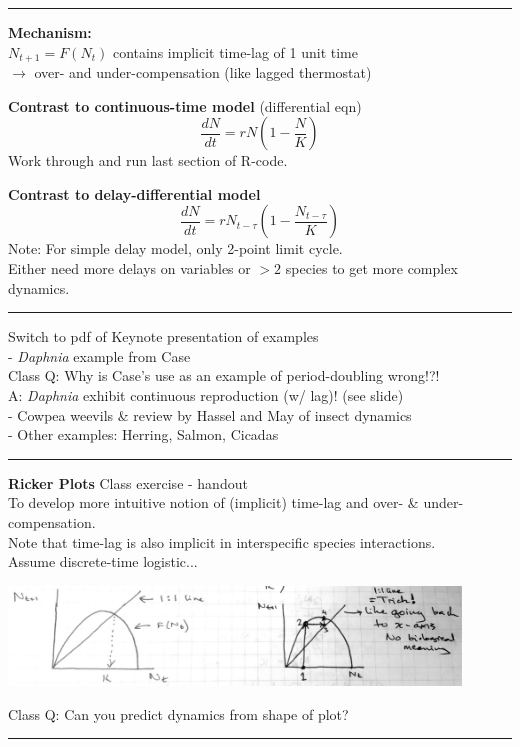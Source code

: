 \documentclass{article}
\newcommand{\note}[1]{\colorbox{gray!30}{#1}}
\newcommand{\ind}{\-\hspace{1cm}}
\begin{document}
\rule[0.5ex]{\linewidth}{1pt}
\pagebreak

\textbf{Mechanism:}\\
$N_{t+1} = F(N_t)$ contains implicit time-lag of 1 unit time\\
\ind $\to$ over- and under-compensation (like lagged thermostat)

\textbf{Contrast to continuous-time model} (differential eqn)\\
\begin{equation*}
	\frac{dN}{dt}=rN\left(1-\frac{N}{K}\right)
\end{equation*}
\note{Work through and run last section of R-code.}

\textbf{Contrast to delay-differential model}
\begin{equation*}
	\frac{dN}{dt}=rN_{t-\tau}\left(1-\frac{N_{t-\tau}}{K}\right)
\end{equation*}
Note: For simple delay model, only 2-point limit cycle.  \\
\ind  Either need more delays on variables or $>2$ species to get more complex dynamics.

\rule[0.5ex]{\linewidth}{1pt}

\note{Switch to pdf of Keynote presentation of examples}\\
\ind - \emph{Daphnia} example from Case\\
\ind \ind \note{Class Q:} Why is Case's use as an example of period-doubling wrong!?!\\
\ind \ind \note{A:} \emph{Daphnia} exhibit continuous reproduction (w/ lag)! (see slide)\\
\ind - Cowpea weevils \& review by Hassel and May of insect dynamics\\
\ind - Other examples: Herring, Salmon, Cicadas\\

\rule[0.5ex]{\linewidth}{1pt}

\textbf{Ricker Plots} \note{Class exercise - handout}\\
To develop more intuitive notion of (implicit) time-lag and over- \& under-compensation.\\
Note that time-lag is also implicit in interspecific species interactions.\\
Assume discrete-time logistic...

\begin{center}
	\includegraphics[width=12cm]{figs/RickerCurve.pdf}
\end{center}

\note{Class Q:} Can you predict dynamics from shape of plot?\\

\rule[0.5ex]{\linewidth}{1pt}
\end{document}
